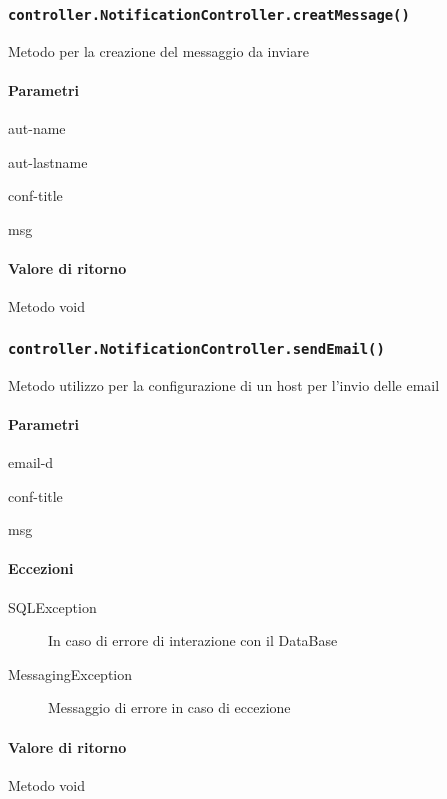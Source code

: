 \subsubsection{\texttt{controller.NotificationController.creatMessage()}}
Metodo per la creazione del messaggio da inviare
\paragraph{Parametri}
\begin{description}
\item aut-name
\item aut-lastname
\item conf-title
\item msg
\end{description}
\paragraph{Valore di ritorno}
Metodo void

\subsubsection{\texttt{controller.NotificationController.sendEmail()}}
Metodo utilizzo per la configurazione di un host per l'invio delle email
\paragraph{Parametri}
\begin{description}
\item email-d
\item conf-title
\item msg
\end{description}
\paragraph{Eccezioni}
\begin{description}
\item[SQLException] In caso di errore di interazione con il DataBase
\item[MessagingException] Messaggio di errore in caso di eccezione
\end{description}
\paragraph{Valore di ritorno}
Metodo void



